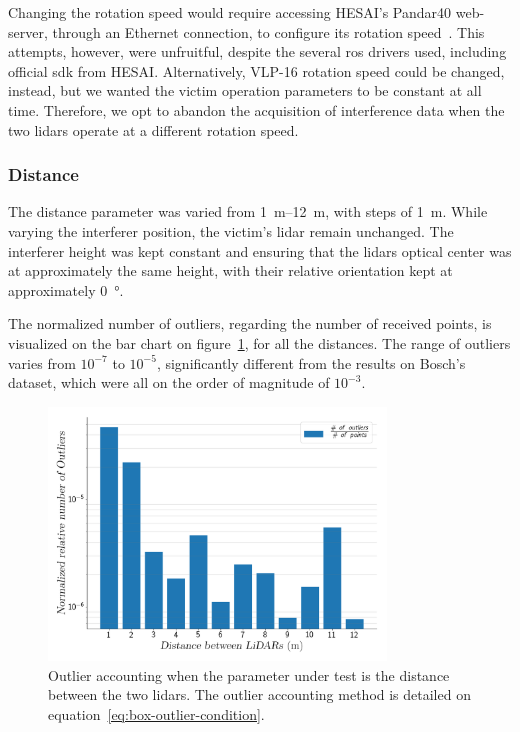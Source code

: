 Changing the rotation speed would require accessing HESAI's Pandar40 web-server, through an Ethernet connection, to configure its rotation speed~\cite{Pandar40UserGuide}. This attempts, however, were unfruitful, despite the several \ac{ros} drivers used, including official \ac{sdk} from HESAI\cp. Alternatively, VLP-16 rotation speed could be changed, instead, but we wanted the victim operation parameters to be constant at all time. Therefore, we opt to abandon the acquisition of interference data when the two \acp{lidar} operate at a different rotation speed.

\subsubsection{Distance}
The distance parameter was varied from \SIrange{1}{12}{\meter}, with steps of \SI{1}{\meter}. While varying the interferer position, the victim's \ac{lidar} remain unchanged. The interferer height was kept constant and ensuring that the \acp{lidar} optical center was at approximately the same height, with their relative orientation kept at approximately \SI{0}{\degree}.

The normalized number of outliers, regarding the number of received points, is visualized on the bar chart on figure~\ref{fig:box-filter-outliers-distance}, for all the distances. The range of outliers varies from $10^{-7}$ to $10^{-5}$, significantly different from the results on Bosch's dataset, which were all on the order of magnitude of $10^{-3}$.

\begin{figure}[!ht]
	\centering
	\includegraphics[width=0.8\textwidth]{img/lidar-interference/box-filtering/interference-box-filter-outliers-distance.png}
	\caption{Outlier accounting when the parameter under test is the distance between the two \acp{lidar}. The outlier accounting method is detailed on equation~\ref{eq:box-outlier-condition}.}
	\label{fig:box-filter-outliers-distance}
\end{figure}

